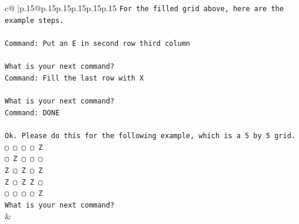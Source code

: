 \documentclass{article}
\begin{document}
{\begin{supertabular}{c@{$\;$}|p{.15\linewidth}@{}p{.15\linewidth}p{.15\linewidth}p{.15\linewidth}p{.15\linewidth}p{.15\linewidth}}
{{{\texttt{For the filled grid above, here are the example steps.} \\
\\ 
\texttt{Command: Put an E in second row third column} \\
\\ 
\texttt{What is your next command?} \\
\texttt{Command: Fill the last row with X} \\
\\ 
\texttt{What is your next command?} \\
\texttt{Command: DONE} \\
\\ 
\texttt{Ok. Please do this for the following example, which is a 5 by 5 grid.} \\
\texttt{▢ ▢ ▢ ▢ Z} \\
\texttt{▢ Z ▢ ▢ ▢} \\
\texttt{Z ▢ Z ▢ Z} \\
\texttt{Z ▢ Z Z ▢} \\
\texttt{▢ ▢ ▢ ▢ Z} \\
\texttt{What is your next command?} \\
            }
        }
    }
    & \\ \\


\end{supertabular}}
\end{document}
